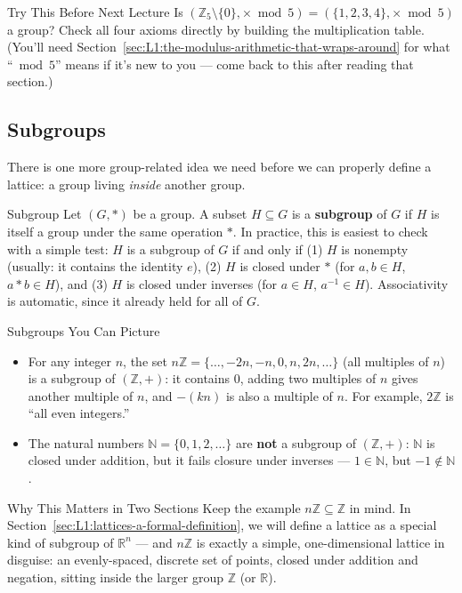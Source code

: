 \begin{exercisebox}{Try This Before Next Lecture}
Is $(\mathbb{Z}_5 \setminus \{0\}, \times \bmod 5) = (\{1,2,3,4\}, \times \bmod 5)$ a group? Check all four axioms directly by building the multiplication table. (You'll need Section~\ref{sec:L1:the-modulus-arithmetic-that-wraps-around} for what ``$\bmod 5$'' means if it's new to you --- come back to this after reading that section.)
\end{exercisebox}

\subsection{Subgroups}
\label{sec:L1:subgroups}

There is one more group-related idea we need before we can properly define a lattice: a group living \emph{inside} another group.

\begin{defbox}{Subgroup}
Let $(G, *)$ be a group. A subset $H \subseteq G$ is a \textbf{subgroup} of $G$ if $H$ is itself a group under the same operation $*$. In practice, this is easiest to check with a simple test: $H$ is a subgroup of $G$ if and only if (1) $H$ is nonempty (usually: it contains the identity $e$), (2) $H$ is closed under $*$ (for $a,b \in H$, $a*b \in H$), and (3) $H$ is closed under inverses (for $a \in H$, $a^{-1} \in H$). Associativity is automatic, since it already held for all of $G$.
\end{defbox}

\begin{exbox}{Subgroups You Can Picture}
\begin{itemize}[leftmargin=*]
  \item For any integer $n$, the set $n\mathbb{Z} = \{\ldots, -2n, -n, 0, n, 2n, \ldots\}$ (all multiples of $n$) is a subgroup of $(\mathbb{Z}, +)$: it contains $0$, adding two multiples of $n$ gives another multiple of $n$, and $-(kn)$ is also a multiple of $n$. For example, $2\mathbb{Z}$ is ``all even integers.''
  \item The natural numbers $\mathbb{N} = \{0,1,2,\ldots\}$ are \textbf{not} a subgroup of $(\mathbb{Z},+)$: $\mathbb{N}$ is closed under addition, but it fails closure under inverses --- $1 \in \mathbb{N}$, but $-1 \notin \mathbb{N}$.
\end{itemize}
\end{exbox}

\begin{previewbox}{Why This Matters in Two Sections}
Keep the example $n\mathbb{Z} \subseteq \mathbb{Z}$ in mind. In Section~\ref{sec:L1:lattices-a-formal-definition}, we will define a lattice as a special kind of subgroup of $\mathbb{R}^n$ --- and $n\mathbb{Z}$ is exactly a simple, one-dimensional lattice in disguise: an evenly-spaced, discrete set of points, closed under addition and negation, sitting inside the larger group $\mathbb{Z}$ (or $\mathbb{R}$).
\end{previewbox}

